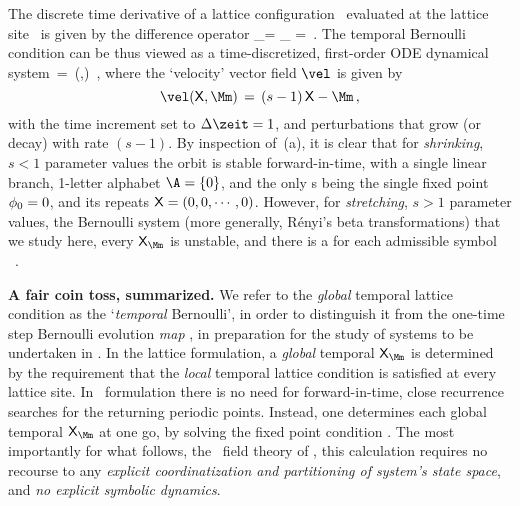 The discrete time derivative of a lattice configuration \Xx\ evaluated at the
lattice site \zeit\ is given by the {difference operator}
\beq
\dot{\ssp}_\zeit =
\left[\frac{\partial\Xx}{\partial\zeit}\right]_\zeit
        =
\,.
The {temporal Bernoulli} condition  %
can be thus viewed as a time-discretized, first-order ODE dynamical
system
\beq
   \dot{\Xx} \,=\, \vel(\Xx,\Mm) \,,
where the `velocity' vector field $\vel$ is given by
\[
\vel(\Xx,\Mm) \,=\,
(s-1)\,\Xx-\Mm
\,,
\]
with the time increment set to $\Delta\zeit=1$, and perturbations that
grow (or decay) with rate $({s}-1)$. By inspection of
\,(a), it is clear that for \emph{shrinking},
${s}<1$  parameter values the orbit is stable for\-ward-in-time, with a
single linear branch, 1-letter alphabet $\A=\{0\}$, and the only
{\lattstate}s being the single fixed point  $\phi_0=0$, and its repeats
$\mathsf{X}=(0,0,\cdots,0)$. However, for \emph{stretching},  ${s}>1$  parameter
values, the Bernoulli system (more generally, R{\'e}nyi's beta
transformations) that we study here, every {\lattstate}
$\Xx_\Mm$ is unstable, and there is a {\lattstate} for each admissible
symbol \brick\ \Mm.

\bigskip

\noindent\textbf{A fair coin toss, summarized.}
We refer to the \emph{global} temporal lattice condition 
as the `\emph{temporal} Bernoulli', in order to distinguish it from the
one-time step Bernoulli evolution \emph{map} , in
preparation for the study of \emph{\spt} systems to be undertaken in
. In the lattice formulation, a \emph{global} {temporal
{\lattstate}} $\Xx_\Mm$ is determined by the requirement that the
\emph{local} temporal lattice condition  is satisfied
at every lattice site. In \spt\ formulation there is no need for
for\-ward-in-time, close recurrence searches for the returning periodic
points. Instead, one determines each global {temporal {\lattstate}}
$\Xx_\Mm$ at one go, by solving the fixed point condition
. The most importantly for what follows, the \spt\
field theory of , this calculation requires no recourse to any
\emph{explicit coordinatization and partitioning of system's state
space}, and \emph{no explicit symbolic dynamics}.

